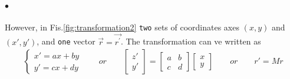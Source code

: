             \paragraph{$\bullet$}However, in Fis.\eqref{fig:transformation2} \texttt{two} sets of coordinates 
            axes $(x, y)$ and $(x', y')$, and \texttt{one} vector $\vec{r} = \vec{r^\prime}$. The
            transformation can ve written as 
            \begin{align}
                \label{eq:transformation:2}
                \begin{cases}
                    x' = ax + by \\
                    y' = cx + dy
                \end{cases}
                \qquad or \qquad 
                \begin{bmatrix}
                    z'\\ y'
                \end{bmatrix} = 
                \begin{bmatrix}
                    a & b \\
                    c & d
                \end{bmatrix}
                \begin{bmatrix}
                    x \\ y
                \end{bmatrix}
                \qquad or \qquad 
                r' = Mr
            \end{align}

